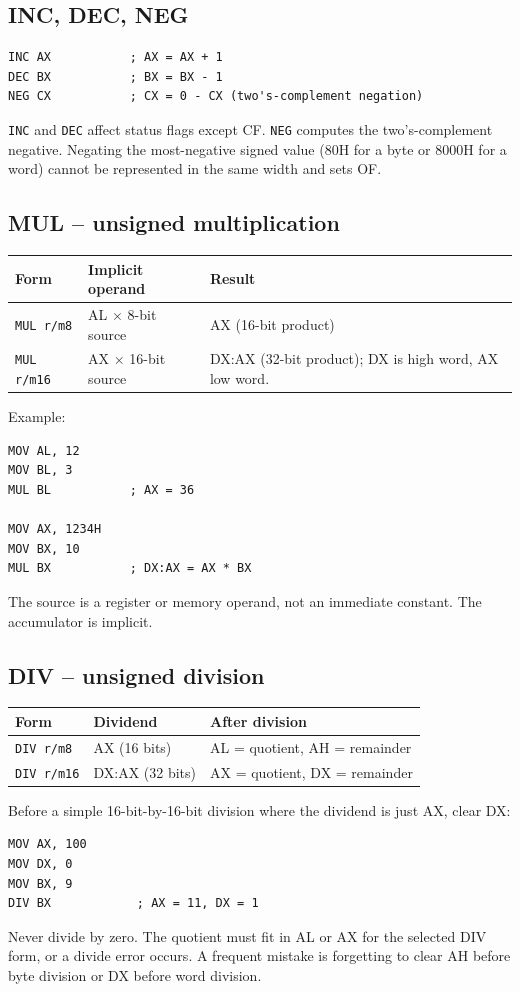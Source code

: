 \documentclass[11pt,a4paper]{article}
\begin{document}
\subsection{INC, DEC, NEG}
\begin{lstlisting}[style=asm]
INC AX           ; AX = AX + 1
DEC BX           ; BX = BX - 1
NEG CX           ; CX = 0 - CX (two's-complement negation)
\end{lstlisting}
\texttt{INC} and \texttt{DEC} affect status flags except CF. \texttt{NEG} computes the two's-complement negative. Negating the most-negative signed value (80H for a byte or 8000H for a word) cannot be represented in the same width and sets OF.

\subsection{MUL -- unsigned multiplication}
\begin{tabularx}{\linewidth}{lXX}
\toprule \textbf{Form} & \textbf{Implicit operand} & \textbf{Result}\\
\midrule
\texttt{MUL r/m8} & AL $\times$ 8-bit source & AX (16-bit product)\\
\texttt{MUL r/m16} & AX $\times$ 16-bit source & DX:AX (32-bit product); DX is high word, AX low word.\\
\bottomrule
\end{tabularx}
Example:
\begin{lstlisting}[style=asm]
MOV AL, 12
MOV BL, 3
MUL BL           ; AX = 36

MOV AX, 1234H
MOV BX, 10
MUL BX           ; DX:AX = AX * BX
\end{lstlisting}
The source is a register or memory operand, not an immediate constant. The accumulator is implicit.

\subsection{DIV -- unsigned division}
\begin{tabularx}{\linewidth}{lXX}
\toprule \textbf{Form} & \textbf{Dividend} & \textbf{After division}\\
\midrule
\texttt{DIV r/m8} & AX (16 bits) & AL = quotient, AH = remainder\\
\texttt{DIV r/m16} & DX:AX (32 bits) & AX = quotient, DX = remainder\\
\bottomrule
\end{tabularx}
Before a simple 16-bit-by-16-bit division where the dividend is just AX, clear DX:
\begin{lstlisting}[style=asm]
MOV AX, 100
MOV DX, 0
MOV BX, 9
DIV BX            ; AX = 11, DX = 1
\end{lstlisting}
Never divide by zero. The quotient must fit in AL or AX for the selected DIV form, or a divide error occurs. A frequent mistake is forgetting to clear AH before byte division or DX before word division.
\end{document}
